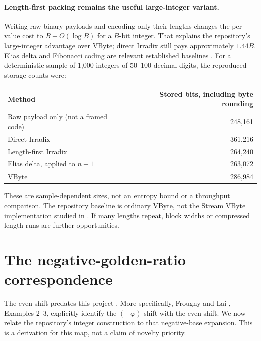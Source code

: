 \documentclass[11pt]{article}
\theoremstyle{definition}\newtheorem{definition}[theorem]{Definition}
\newcommand{\ph}{\varphi}
\begin{document}
\paragraph{Length-first packing remains the useful large-integer variant.}
Writing raw binary payloads and encoding only their lengths changes
the per-value cost to $B+O(\log B)$ for a $B$-bit integer. That explains
the repository's large-integer advantage over VByte; direct Irradix
still pays approximately $1.44B$. Elias delta and Fibonacci coding are
relevant established baselines \cite{apostolico,compression}.
For a deterministic sample of 1,000 integers of 50--100 decimal digits,
the reproduced storage counts were:
\begin{center}
\begin{tabular}{lr}
\toprule
Method & Stored bits, including byte rounding\\
\midrule
Raw payload only (not a framed code)&248,161\\
Direct Irradix&361,216\\
Length-first Irradix&264,240\\
Elias delta, applied to $n+1$&263,072\\
VByte&286,984\\
\bottomrule
\end{tabular}
\end{center}
These are sample-dependent sizes, not an entropy bound or a throughput
comparison. The repository baseline is ordinary VByte, not the
Stream VByte implementation studied in \cite{streamvbyte}. If many lengths repeat, block widths or compressed length
runs are further opportunities.

\section{The negative-golden-ratio correspondence}
The even shift predates this project \cite{lind,pivato}. More specifically,
Frougny and Lai \cite{negative}, Examples 2--3, explicitly identify the
$(-\ph)$-shift with the even shift. We now relate the repository's
integer construction to that negative-base expansion. This is a derivation
for this map, not a claim of novelty priority.
\end{document}

